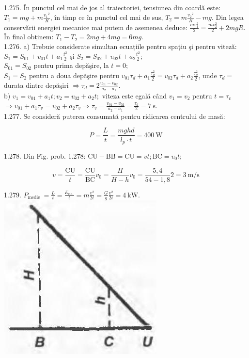 \documentclass[10pt]{article}
\begin{document}
1.275. În punctul cel mai de jos al traiectoriei, tensiunea din coardă este: $T_{1}=m g+m \frac{v_{1}{ }^{2}}{R}$, în timp ce în punctul cel mai de sus, $T_{2}=m \frac{v_{2}{ }^{2}}{R}-m g$. Din legea conservării energiei mecanice mai putem de asemenea deduce: $\frac{m v_{1}^{2}}{2}=\frac{m v_{2}^{2}}{2}+2 m g R$. În final obținem: $T_{1}-T_{2}=2 m g+4 m g=6 m g$.\\
1.276. a) Trebuie considerate simultan ecuațiile pentru spațiu şi pentru viteză:\\
$S_{1}=S_{01}+v_{01} t+a_{1} \frac{t^{2}}{2}$ şi $S_{2}=S_{02}+v_{02} t+a_{2} \frac{t^{2}}{2}$;\\
$S_{01}=S_{02}$ pentru prima depăşire, la $t=0$;\\
$S_{1}=S_{2}$ pentru a doua depãşire pentru $v_{01} \tau_{d}+a_{1} \frac{\tau_{d}^{2}}{2}=v_{02} \tau_{d}+a_{2} \frac{\tau_{d}^{2}}{2}$, unde $\tau_{d}=$ durata dintre depăşiri $\Rightarrow \tau_{d}=2 \frac{v_{01}-v_{02}}{a_{2}-a_{1}}$.\\
b) $v_{1}=v_{01}+a_{1} t ; v_{2}=v_{02}+a_{2} t ;$ viteza este egală când $v_{1}=v_{2}$ pentru $t=\tau_{v}$ $\Rightarrow v_{01}+a_{1} \tau_{v}=v_{02}+a_{2} \tau_{v} \Rightarrow \tau_{v}=\frac{v_{01}-v_{02}}{a_{2}-a_{1}}=\frac{\tau_{d}}{2}=7 \mathrm{~s}$.\\
1.277. Se consideră puterea consumată pentru ridicarea centrului de masă:

$$
P=\frac{L}{t}=\frac{m g h d}{l_{p} \cdot t}=400 \mathrm{~W}
$$

1.278. Din Fig. prob. 1.278: $\mathrm{CU}-\mathrm{BB}=\mathrm{CU}=v t ; \mathrm{BC}=v_{0} t$;

$$
v=\frac{\mathrm{CU}}{t}=\frac{\mathrm{CU}}{\mathrm{BC}} v_{0}=\frac{H}{H-h} v_{0}=\frac{5,4}{54-1,8} 2=3 \mathrm{~m} / \mathrm{s}
$$

1.279. $P_{\text {medie }}=\frac{L}{t}=\frac{E_{\text {cin }}}{t}=m \frac{v^{2}}{2 t}=\frac{G}{g} \frac{v^{2}}{2 t}=4 \mathrm{~kW}$.\\
\includegraphics[max width=\textwidth, center]{2025_07_01_5b3ff9fa0d508c8e9f17g-259}
\end{document}
